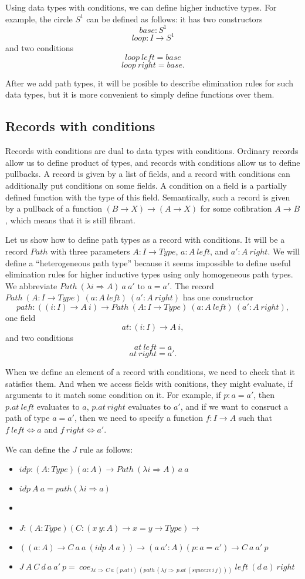 \documentclass{amsart}
\theoremstyle{definition}
\theoremstyle{remark}
\newcommand{\red}{\Rightarrow}
\newcommand{\deq}{\Leftrightarrow}
\numberwithin{figure}{section}
\begin{document}
Using data types with conditions, we can define higher inductive types.
For example, the circle $S^1$ can be defined as follows: it has two constructors
\[ base : S^1 \]
\[ loop : I \to S^1 \]
and two conditions
\[ loop\ left = base \]
\[ loop\ right = base. \]

After we add path types, it will be posible to describe elimination rules for such data types,
but it is more convenient to simply define functions over them.

\subsection{Records with conditions}

Records with conditions are dual to data types with conditions.
Ordinary records allow us to define product of types, and records with conditions allow us to define pullbacks.
A record is given by a list of fields, and a record with conditions can additionally put conditions on some fields.
A condition on a field is a partially defined function with the type of this field.
Semantically, such a record is given by a pullback of a function $(B \to X) \to (A \to X)$ for some cofibration $A \to B$, which means that it is still fibrant.

Let us show how to define path types as a record with conditions.
It will be a record $Path$ with three parameters $A : I \to Type$, $a : A\ left$, and $a' : A\ right$.
We will define a ``heterogeneous path type'' because it seems impossible to define useful elimination rules for higher inductive types using only homogeneous path types.
We abbreviate $Path\ (\lambda i \red A)\ a\ a'$ to $a = a'$.
The record $Path\ (A : I \to Type)\ (a : A\ left)\ (a' : A\ right)$ has one constructor
\[ path : ((i : I) \to A\ i) \to Path\ (A : I \to Type)\ (a : A\ left)\ (a' : A\ right), \]
one field
\[ at : (i : I) \to A\ i, \]
and two conditions
\[ at\ left = a \]
\[ at\ right = a'. \]

When we define an element of a record with conditions, we need to check that it satisfies them.
And when we access fields with conitions, they might evaluate, if arguments to it match some condition on it.
For example, if $p : a = a'$, then $p.at\ left$ evaluates to $a$, $p.at\ right$ evaluates to $a'$,
and if we want to consruct a path of type $a = a'$, then we need to specify a function $f : I \to A$ such that $f\ left \deq a$ and $f\ right \deq a'$.

We can define the $J$ rule as follows:
\begin{itemize}
\item[] $idp : (A : Type) (a : A) \to Path\ (\lambda i \red A)\ a\ a$
\item[] $idp\ A\ a = path (\lambda i \red a)$
\item[]
\item[] $J : (A : Type) (C : (x\ y : A) \to x = y \to Type) \to$
\item[] \qquad $((a : A) \to C\ a\ a\ (idp\ A\ a)) \to (a\ a' : A) (p : a = a') \to C\ a\ a'\ p$
\item[] $J\ A\ C\ d\ a\ a'\ p =\ coe_{\lambda i \red \,C\,a\,(p.at\,i)\,(path\,(\lambda j \red \,p.at\,(squeeze\,i\,j)))}\ left\ (d\ a)\ right$
\end{itemize}
\end{document}
